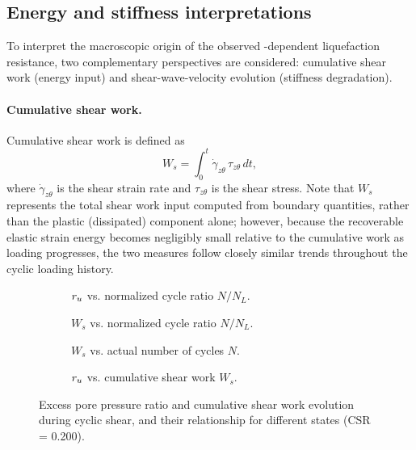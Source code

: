 \subsection{Energy and stiffness interpretations}
\label{subsec:energy_stiffness}

To interpret the macroscopic origin of the observed \Kzero{}-dependent liquefaction resistance, two complementary perspectives are considered: cumulative shear work (energy input) and shear-wave-velocity evolution (stiffness degradation).

\paragraph{Cumulative shear work.}
Cumulative shear work is defined as \citep{TowhataIshihara1985}
\begin{equation}
W_s = \int_0^t \dot{\gamma}_{z\theta}\,\tau_{z\theta}\,dt,
\label{eq:cumulative_shear_work}
\end{equation}
where $\dot{\gamma}_{z\theta}$ is the shear strain rate and $\tau_{z\theta}$ is the shear stress. Note that $W_s$ represents the total shear work input computed from boundary quantities, rather than the plastic (dissipated) component alone; however, because the recoverable elastic strain energy becomes negligibly small relative to the cumulative work as loading progresses, the two measures follow closely similar trends throughout the cyclic loading history.

\begin{figure}
  \centering
  \begin{subfigure}[t]{0.48\textwidth}
    \centering
    \caption{$r_u$ vs. normalized cycle ratio $N/N_L$.}
    \label{fig:energy_work_a}
  \end{subfigure}
  \hfill
  \begin{subfigure}[t]{0.48\textwidth}
    \centering
    \caption{$W_s$ vs. normalized cycle ratio $N/N_L$.}
    \label{fig:energy_work_b}
  \end{subfigure}

  \vspace{0.5em}

  \begin{subfigure}[t]{0.48\textwidth}
    \centering
    \caption{$W_s$ vs. actual number of cycles $N$.}
    \label{fig:energy_work_c}
  \end{subfigure}
  \hfill
  \begin{subfigure}[t]{0.48\textwidth}
    \centering
    \caption{$r_u$ vs. cumulative shear work $W_s$.}
    \label{fig:energy_work_d}
  \end{subfigure}
  \caption{Excess pore pressure ratio and cumulative shear work evolution during cyclic shear, and their relationship for different \Kzero{} states (CSR = 0.200).}
  \label{fig:energy_work}
\end{figure}

